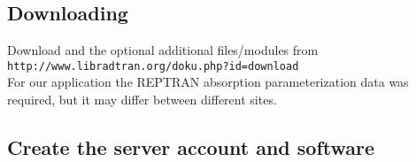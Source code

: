 \subsection{Downloading  \libradtran{}}

Download \libradtran{} and the optional additional files/modules from\\
\lstinline{http://www.libradtran.org/doku.php?id=download}\\
For our application the REPTRAN absorption parameterization data was required, but it may differ between different sites.


\subsection{Create the server account and software}

